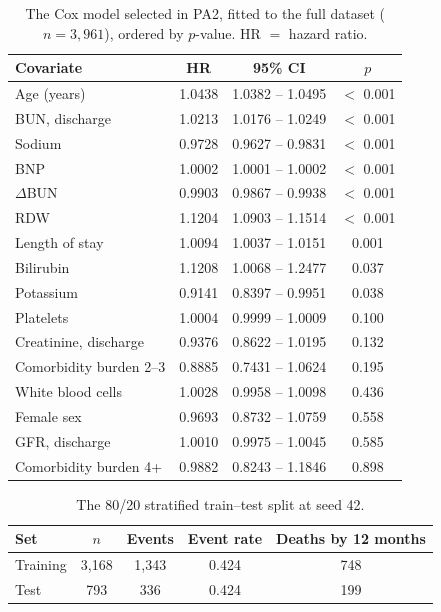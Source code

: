 \documentclass[11pt,a4paper]{article}
\newcommand{\dbun}{$\Delta$BUN}
\begin{document}
\begin{table}[H]
\centering
\caption{The Cox model selected in PA2, fitted to the full dataset
($n = 3{,}961$), ordered by $p$-value. HR $=$ hazard ratio.}
\label{tab:pa2cox}
\vspace{0.3em}
\small
\begin{tabular}{lccc}
\toprule
Covariate & HR & 95\% CI & $p$ \\
\midrule
Age (years)            & 1.0438 & 1.0382 -- 1.0495 & $<$ 0.001 \\
BUN, discharge         & 1.0213 & 1.0176 -- 1.0249 & $<$ 0.001 \\
Sodium                 & 0.9728 & 0.9627 -- 0.9831 & $<$ 0.001 \\
BNP                    & 1.0002 & 1.0001 -- 1.0002 & $<$ 0.001 \\
\dbun{}                & 0.9903 & 0.9867 -- 0.9938 & $<$ 0.001 \\
RDW                    & 1.1204 & 1.0903 -- 1.1514 & $<$ 0.001 \\
Length of stay         & 1.0094 & 1.0037 -- 1.0151 & 0.001 \\
Bilirubin              & 1.1208 & 1.0068 -- 1.2477 & 0.037 \\
Potassium              & 0.9141 & 0.8397 -- 0.9951 & 0.038 \\
Platelets              & 1.0004 & 0.9999 -- 1.0009 & 0.100 \\
Creatinine, discharge  & 0.9376 & 0.8622 -- 1.0195 & 0.132 \\
Comorbidity burden 2--3& 0.8885 & 0.7431 -- 1.0624 & 0.195 \\
White blood cells      & 1.0028 & 0.9958 -- 1.0098 & 0.436 \\
Female sex             & 0.9693 & 0.8732 -- 1.0759 & 0.558 \\
GFR, discharge         & 1.0010 & 0.9975 -- 1.0045 & 0.585 \\
Comorbidity burden 4+  & 0.9882 & 0.8243 -- 1.1846 & 0.898 \\
\bottomrule
\end{tabular}
\end{table}

\begin{table}[H]
\centering
\caption{The 80/20 stratified train--test split at seed 42.}
\label{tab:split}
\vspace{0.3em}
\small
\begin{tabular}{lcccc}
\toprule
Set & $n$ & Events & Event rate & Deaths by 12 months \\
\midrule
Training & 3,168 & 1,343 & 0.424 & 748 \\
Test     & 793   & 336   & 0.424 & 199 \\
\bottomrule
\end{tabular}
\end{table}
\end{document}
